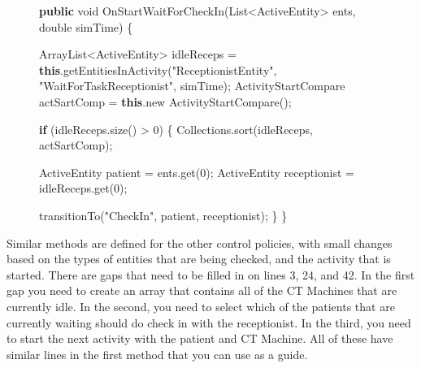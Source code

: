 \documentclass[
  10pt,
  a4paperpaper,
  DIV=11,
  numbers=noendperiod,
  oneside]{scrreprt}
\newenvironment{Shaded}{\begin{snugshade}}{\end{snugshade}}
\newcommand{\BuiltInTok}[1]{\textcolor[rgb]{0.00,0.23,0.31}{#1}}
\newcommand{\ControlFlowTok}[1]{\textcolor[rgb]{0.00,0.23,0.31}{\textbf{#1}}}
\newcommand{\DataTypeTok}[1]{\textcolor[rgb]{0.68,0.00,0.00}{#1}}
\newcommand{\DecValTok}[1]{\textcolor[rgb]{0.68,0.00,0.00}{#1}}
\newcommand{\FunctionTok}[1]{\textcolor[rgb]{0.28,0.35,0.67}{#1}}
\newcommand{\KeywordTok}[1]{\textcolor[rgb]{0.00,0.23,0.31}{\textbf{#1}}}
\newcommand{\NormalTok}[1]{\textcolor[rgb]{0.00,0.23,0.31}{#1}}
\newcommand{\OperatorTok}[1]{\textcolor[rgb]{0.37,0.37,0.37}{#1}}
\newcommand{\StringTok}[1]{\textcolor[rgb]{0.13,0.47,0.30}{#1}}
\begin{document}
\begin{figure}

\begin{codebox}

\begin{Shaded}
\begin{Highlighting}[numbers=left,,]
\KeywordTok{public} \DataTypeTok{void} \FunctionTok{OnStartWaitForCheckIn}\OperatorTok{(}\BuiltInTok{List}\OperatorTok{\textless{}}\NormalTok{ActiveEntity}\OperatorTok{\textgreater{}}\NormalTok{ ents}\OperatorTok{,} \DataTypeTok{double}\NormalTok{ simTime}\OperatorTok{)} \OperatorTok{\{}
        
    \BuiltInTok{ArrayList}\OperatorTok{\textless{}}\NormalTok{ActiveEntity}\OperatorTok{\textgreater{}}\NormalTok{ idleReceps }\OperatorTok{=} \KeywordTok{this}\OperatorTok{.}\FunctionTok{getEntitiesInActivity}\OperatorTok{(}\StringTok{"ReceptionistEntity"}\OperatorTok{,} \StringTok{"WaitForTaskReceptionist"}\OperatorTok{,}\NormalTok{ simTime}\OperatorTok{);}
\NormalTok{    ActivityStartCompare actSartComp }\OperatorTok{=} \KeywordTok{this}\OperatorTok{.}\FunctionTok{new} \FunctionTok{ActivityStartCompare}\OperatorTok{();}        
    
    \ControlFlowTok{if} \OperatorTok{(}\NormalTok{idleReceps}\OperatorTok{.}\FunctionTok{size}\OperatorTok{()} \OperatorTok{\textgreater{}} \DecValTok{0}\OperatorTok{)} \OperatorTok{\{}
      \BuiltInTok{Collections}\OperatorTok{.}\FunctionTok{sort}\OperatorTok{(}\NormalTok{idleReceps}\OperatorTok{,}\NormalTok{ actSartComp}\OperatorTok{);}
      
\NormalTok{      ActiveEntity patient }\OperatorTok{=}\NormalTok{ ents}\OperatorTok{.}\FunctionTok{get}\OperatorTok{(}\DecValTok{0}\OperatorTok{);}
\NormalTok{      ActiveEntity receptionist }\OperatorTok{=}\NormalTok{ idleReceps}\OperatorTok{.}\FunctionTok{get}\OperatorTok{(}\DecValTok{0}\OperatorTok{);}
      
      \FunctionTok{transitionTo}\OperatorTok{(}\StringTok{"CheckIn"}\OperatorTok{,}\NormalTok{ patient}\OperatorTok{,}\NormalTok{ receptionist}\OperatorTok{);}
    \OperatorTok{\}}
  \OperatorTok{\}}
\end{Highlighting}
\end{Shaded}

\end{codebox}

\end{figure}%

Similar methods are defined for the other control policies, with small
changes based on the types of entities that are being checked, and the
activity that is started. There are gaps that need to be filled in on
lines 3, 24, and 42. In the first gap you need to create an array that
contains all of the CT Machines that are currently idle. In the second,
you need to select which of the patients that are currently waiting
should do check in with the receptionist. In the third, you need to
start the next activity with the patient and CT Machine. All of these
have similar lines in the first method that you can use as a guide.
\end{document}
